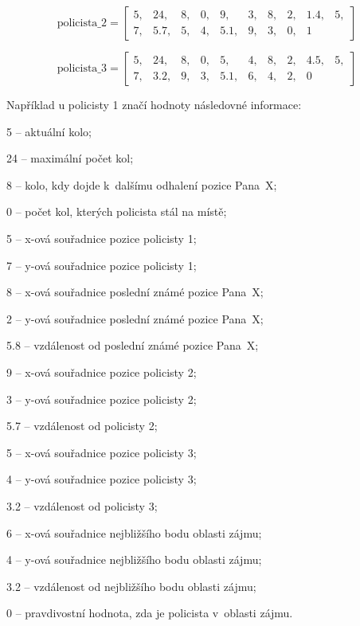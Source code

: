 \[
\text{policista\_2} = \begin{bmatrix}
5, & 24, & 8, & 0, & 9, & 3, & 8, & 2, & 1.4, & 5, \\
7, & 5.7, & 5, & 4, & 5.1, & 9, & 3, & 0, & 1
\end{bmatrix}
\]

\[
\text{policista\_3} = \begin{bmatrix}
5, & 24, & 8, & 0, & 5, & 4, & 8, & 2, & 4.5, & 5, \\
7, & 3.2, & 9, & 3, & 5.1, & 6, & 4, & 2, & 0
\end{bmatrix}
\]

\pagebreak

Například u policisty 1 značí hodnoty následovné informace:
\begin{myitemize}
  \item 5 -- aktuální kolo;
  \item 24 -- maximální počet kol;
  \item 8 -- kolo, kdy dojde k~dalšímu odhalení pozice Pana~X;
  \item 0 -- počet kol, kterých policista stál na místě;
  \item 5 -- x-ová souřadnice pozice policisty 1;
  \item 7 -- y-ová souřadnice pozice policisty 1;
  \item 8 -- x-ová souřadnice poslední známé pozice Pana~X;
  \item 2 -- y-ová souřadnice poslední známé pozice Pana~X;
  \item 5.8 -- vzdálenost od poslední známé pozice Pana~X;
  \item 9 -- x-ová souřadnice pozice policisty 2;
  \item 3 -- y-ová souřadnice pozice policisty 2;
  \item 5.7 -- vzdálenost od policisty 2;
  \item 5 -- x-ová souřadnice pozice policisty 3;
  \item 4 -- y-ová souřadnice pozice policisty 3;
  \item 3.2 -- vzdálenost od policisty 3;
  \item 6 -- x-ová souřadnice nejbližšího bodu oblasti zájmu;
  \item 4 -- y-ová souřadnice nejbližšího bodu oblasti zájmu;
  \item 3.2 -- vzdálenost od nejbližšího bodu oblasti zájmu;
  \item 0 -- pravdivostní hodnota, zda je policista v~oblasti zájmu.
\end{myitemize}

